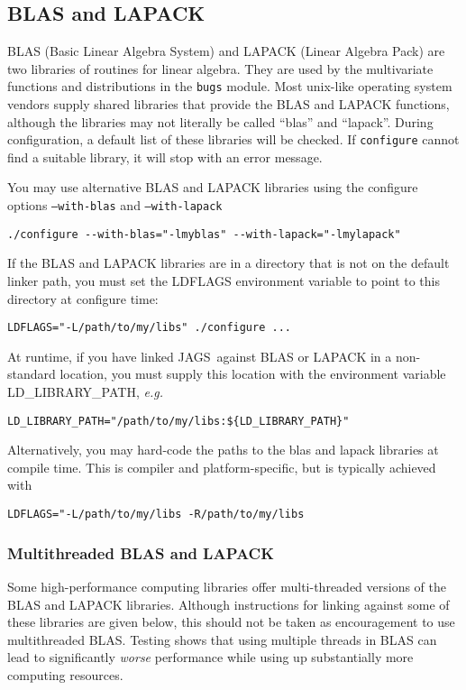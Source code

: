 \documentclass[11pt, a4paper, titlepage]{article}
\newcommand{\JAGS}{\textsf{JAGS}}
\newcommand{\code}[1]{{\bgroup{\normalfont\ttfamily #1}\egroup}}
\begin{document}
\subsection{BLAS and LAPACK}
\label{section:blas:lapack}

BLAS (Basic Linear Algebra System) and LAPACK (Linear Algebra Pack)
are two libraries of routines for linear algebra. They are used by the
multivariate functions and distributions in the \texttt{bugs} module.
Most unix-like operating system vendors supply shared libraries that
provide the BLAS and LAPACK functions, although the libraries may not
literally be called ``blas'' and ``lapack''.  During configuration, a
default list of these libraries will be checked. If \texttt{configure}
cannot find a suitable library, it will stop with an error message.

You may use alternative BLAS and LAPACK libraries using the configure
options \texttt{--with-blas} and \texttt{--with-lapack}
\begin{verbatim}
./configure --with-blas="-lmyblas" --with-lapack="-lmylapack"
\end{verbatim}

If the BLAS and LAPACK libraries are in a directory that is not on the
default linker path, you must set the \code{LDFLAGS} environment variable
to point to this directory at configure time:
\begin{verbatim}
LDFLAGS="-L/path/to/my/libs" ./configure ...
\end{verbatim}

At runtime, if you have linked \JAGS\ against BLAS or LAPACK in
a non-standard location, you must supply this location with the
environment variable \code{LD\_LIBRARY\_PATH}, {\em e.g.}
\begin{verbatim}
LD_LIBRARY_PATH="/path/to/my/libs:${LD_LIBRARY_PATH}"
\end{verbatim} %
Alternatively, you may hard-code the paths to the blas and lapack
libraries at compile time. This is compiler and platform-specific,
but is typically achieved with
\begin{verbatim}
LDFLAGS="-L/path/to/my/libs -R/path/to/my/libs
\end{verbatim}

\subsubsection{Multithreaded BLAS and LAPACK}
\label{section:blas:multithreaded}

Some high-performance computing libraries offer multi-threaded
versions of the BLAS and LAPACK libraries. Although instructions for
linking against some of these libraries are given below, this should
not be taken as encouragement to use multithreaded BLAS.  Testing
shows that using multiple threads in BLAS can lead to significantly
{\em worse} performance while using up substantially more computing
resources.
\end{document}

